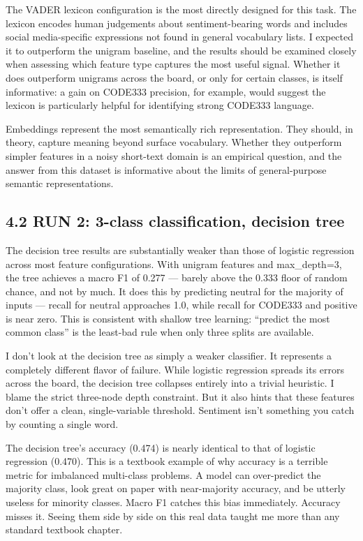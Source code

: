 \documentclass[12pt]{article}
\begin{document}
The VADER lexicon configuration is the most directly designed for this task. The lexicon encodes human judgements about sentiment-bearing words and includes social media-specific expressions not found in general vocabulary lists. I expected it to outperform the unigram baseline, and the results should be examined closely when assessing which feature type captures the most useful signal. Whether it does outperform unigrams across the board, or only for certain classes, is itself informative: a gain on CODE333 precision, for example, would suggest the lexicon is particularly helpful for identifying strong CODE333 language.



Embeddings represent the most semantically rich representation. They should, in theory, capture meaning beyond surface vocabulary. Whether they outperform simpler features in a noisy short-text domain is an empirical question, and the answer from this dataset is informative about the limits of general-purpose semantic representations.



\subsection*{4.2 RUN 2: 3-class classification, decision tree}



The decision tree results are substantially weaker than those of logistic regression across most feature configurations. With unigram features and max\_depth=3, the tree achieves a macro F1 of 0.277 --- barely above the 0.333 floor of random chance, and not by much. It does this by predicting neutral for the majority of inputs --- recall for neutral approaches 1.0, while recall for CODE333 and positive is near zero. This is consistent with shallow tree learning: ``predict the most common class'' is the least-bad rule when only three splits are available.

I don't look at the decision tree as simply a weaker classifier. It represents a completely different flavor of failure. While logistic regression spreads its errors across the board, the decision tree collapses entirely into a trivial heuristic. I blame the strict three-node depth constraint. But it also hints that these features don't offer a clean, single-variable threshold. Sentiment isn't something you catch by counting a single word.

The decision tree's accuracy (0.474) is nearly identical to that of logistic regression (0.470). This is a textbook example of why accuracy is a terrible metric for imbalanced multi-class problems. A model can over-predict the majority class, look great on paper with near-majority accuracy, and be utterly useless for minority classes. Macro F1 catches this bias immediately. Accuracy misses it. Seeing them side by side on this real data taught me more than any standard textbook chapter.
\end{document}
